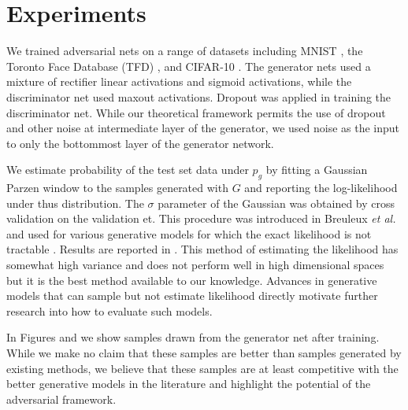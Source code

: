 \section{Experiments}

We trained adversarial nets on %
a range of datasets including MNIST \cite{23_lecun1998gradient}, the Toronto Face Database (TFD) \cite{28_susskind2010toronto}, and CIFAR-10 \cite{21_krizhevsky2009learning}. The generator nets used a mixture of rectifier linear activations \cite{19_5459469,9_pmlr-v15-glorot11a} and sigmoid activations, while the discriminator net used maxout \cite{10_goodfellow2013maxoutnetworks} activations. Dropout \cite{17_hinton2012improvingneuralnetworkspreventing} was applied in training the discriminator net. While our theoretical framework permits the use of dropout and other noise at intermediate layer of the generator, we used noise as the input to only the bottommost layer of the generator network.

We estimate probability of the test set data under $p_g$ by fitting a Gaussian Parzen window to the samples generated with $G$ and reporting the log-likelihood under thus distribution. The $\sigma$ parameter of the Gaussian was obtained by cross validation on the validation et. This procedure was introduced in Breuleux \emph{et al.} \cite{8_6796083} and used for various generative models for which the exact likelihood is not tractable \cite{25_10.5555/3042573.3042804,3_pmlr-v28-bengio13,5_bengio2014deepgenerativestochasticnetworks}. Results are reported in %
. This method of estimating the likelihood has somewhat high variance and does not perform well in high dimensional spaces but it is the best method available to our knowledge. Advances in generative models that can sample but not estimate likelihood directly motivate further research into how to evaluate such models.

In Figures %
and %
we show samples drawn from the generator net after training. While we make no claim that these samples are better than samples generated by existing methods, we believe that these samples are at least competitive with the better generative models in the literature and highlight the potential of the adversarial framework.

